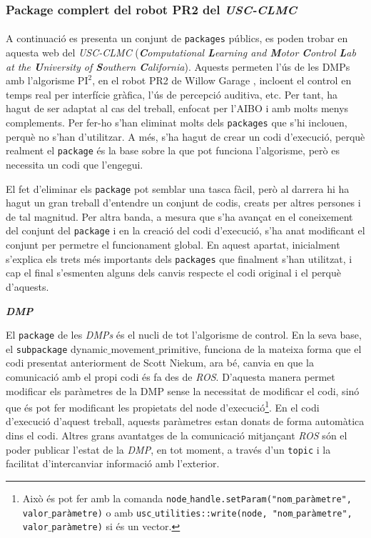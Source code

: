 \documentclass[12pt,a4paper,final,twoside]{article}
\begin{document}
\subsubsection{Package complert del robot PR2 del \textit{USC-CLMC}}
\label{Package-USC-CLMC}

\paragraph{}A continuació es presenta un conjunt de  \texttt{packages} públics, es poden trobar en aquesta web \cite{USC-CLMC-package} del \textit{USC-CLMC} (\textit{\textbf{C}omputational \textbf{L}earning and \textbf{M}otor \textbf{C}ontrol \textbf{L}ab at the \textbf{U}niversity of \textbf{S}outhern \textbf{C}alifornia}). Aquests permeten l'ús de les DMPs amb l'algorisme $\mathrm{PI^2}$, en el robot PR2 de Willow Garage \cite{Bohren2011}, incloent el control en temps real per interfície gràfica, l'ús de percepció auditiva, etc. Per tant, ha hagut de ser adaptat al cas del treball, enfocat per l'AIBO i amb molts menys complements. Per fer-ho s'han eliminat molts dels \texttt{packages} que s'hi inclouen, perquè no s'han d'utilitzar. A més, s'ha hagut de crear un codi d'execució, perquè realment el \texttt{package} és la base sobre la que pot funciona l'algorisme, però es necessita un codi que l'engegui. 

El fet d'eliminar els \texttt{package} pot semblar una tasca fàcil, però al darrera hi ha hagut un gran treball d'entendre un conjunt de codis, creats per altres persones i de tal magnitud. Per altra banda, a mesura que s'ha avançat en el coneixement del conjunt del \texttt{package} i en la creació del codi d'execució, s'ha anat modificant el conjunt per permetre el funcionament global. En aquest apartat, inicialment s'explica els trets més importants dels \texttt{packages} que finalment s'han utilitzat, i cap el final s'esmenten alguns dels canvis respecte el codi original i el perquè d'aquests.


\vspace{20pt}
\textbf{\textit{DMP}}

El \texttt{package} de les \textit{DMPs} és el nucli de tot l'algorisme de control. En la seva base, el \texttt{subpackage} dynamic$\_$movement$\_$primitive, funciona de la mateixa forma que el codi presentat anteriorment de Scott Niekum, ara bé, canvia en que la comunicació amb el propi codi és fa des de \textit{ROS}. D'aquesta manera permet modificar els paràmetres de la DMP sense la necessitat de modificar el codi, sinó que és pot fer modificant les propietats del node d'execució\footnote{Això és pot fer amb la comanda \texttt{node$\_$handle.setParam("nom$\_$paràmetre", valor$\_$paràmetre)} o amb \texttt{usc$\_$utilities::write(node, "nom$\_$paràmetre", valor$\_$paràmetre)} si és un vector.}. En el codi d'execució d'aquest treball, aquests paràmetres estan donats de forma automàtica dins el codi. Altres grans avantatges de la comunicació mitjançant \textit{ROS} són el poder publicar l'estat de la \textit{DMP}, en tot moment, a través d'un \texttt{topic} i la facilitat d'intercanviar informació amb l'exterior.
\end{document}
